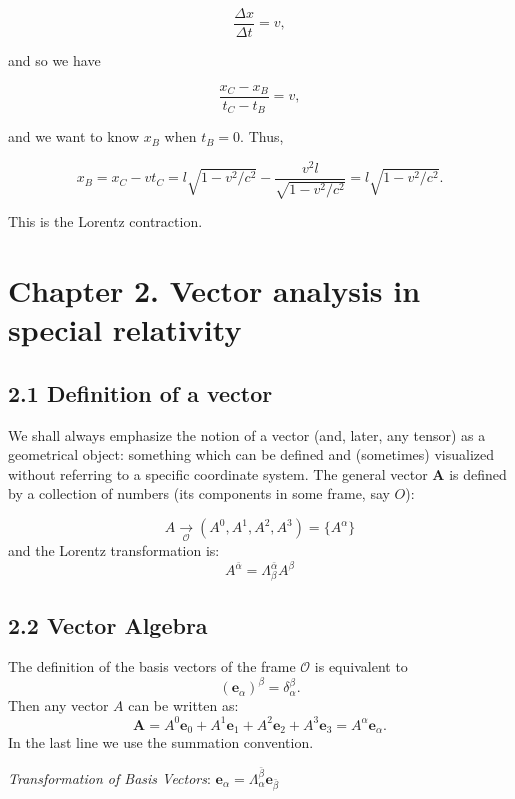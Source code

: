 \documentclass[12pt]{book}
\begin{document}
        \[
        \frac{\Delta x}{\Delta t} = v,
        \]
        
        and so we have
        
        \[
        \frac{x_C - x_B}{t_C - t_B} = v,
        \]
        
        and we want to know \( x_B \) when \( t_B = 0 \). Thus,
        
        \[
        x_B = x_C - vt_C = l \sqrt{1 - v^2/c^2} - \frac{v^2l}{\sqrt{1 - v^2/c^2}} = l \sqrt{1 - v^2/c^2}.
        \]
        
        This is the Lorentz contraction.
                
\section{Chapter 2. Vector analysis in special relativity}

    \subsection{2.1 Definition of a vector}

        We shall always emphasize the notion of a vector (and, later, any tensor) as a geometrical object: something which can be defined and (sometimes) visualized without referring to a specific coordinate system.
        The general vector \( \mathbf{A} \) is defined by a collection of numbers (its components in some frame, say \( O \)):

        \[
        A \underset{\mathcal{O}}{\rightarrow} (A^0, A^1, A^2, A^3) = \{A^\alpha\} 
        \]
        and the Lorentz transformation is:
        \[
            A^{\bar{\alpha}}=\Lambda^{\bar{\alpha}}_\beta A^\beta
        \]
    
    \subsection{2.2 Vector Algebra}

        The definition of the basis vectors of the frame \( \mathcal{O} \) is equivalent to
        \[
        (\mathbf{e}_\alpha)^\beta = \delta_\alpha^\beta.
        \]
        Then any vector \(A\) can be written as:
        \[
        \mathbf{A}= A^0 \mathbf{e}_0 + A^1 \mathbf{e}_1 + A^2 \mathbf{e}_2 + A^3 \mathbf{e}_3 = A^\alpha \mathbf{e}_\alpha.
        \]
        In the last line we use the summation convention.
    
        \textit{Transformation of Basis Vectors}: \quad \( \mathbf{e}_\alpha=\Lambda^{\bar{\beta}}_\alpha \mathbf{e}_{\bar{\beta}}\)
\end{document}
